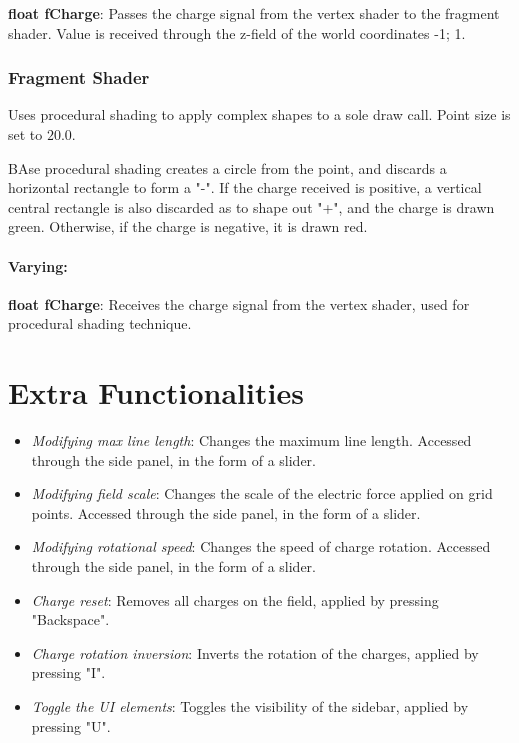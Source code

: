 \documentclass[10pt]{report}
\begin{document}
\textbf{float fCharge}: Passes the charge signal from the vertex shader to the fragment shader. Value is received through the z-field of the world coordinates {-1; 1}.

\subsection{Fragment Shader}

Uses procedural shading to apply complex shapes to a sole draw call. Point size is set to $20.0$.

BAse procedural shading creates a circle from the point, and discards a horizontal rectangle to form a "-".
If the charge received is positive, a vertical central rectangle is also discarded as to shape out "+", and the charge is drawn green.
Otherwise, if the charge is negative, it is drawn red.

\subsubsection{Varying:}

\textbf{float fCharge}: Receives the charge signal from the vertex shader, used for procedural shading technique.

\chapter{Extra Functionalities}

\begin{itemize}
    \item \emph{Modifying max line length}: Changes the maximum line length. Accessed through the side panel, in the form of a slider.
    \item \emph{Modifying field scale}: Changes the scale of the electric force applied on grid points. Accessed through the side panel, in the form of a slider.
    \item \emph{Modifying rotational speed}: Changes the speed of charge rotation. Accessed through the side panel, in the form of a slider.
    \item \emph{Charge reset}: Removes all charges on the field, applied by pressing "Backspace".
    \item \emph{Charge rotation inversion}: Inverts the rotation of the charges, applied by pressing "I".
    \item \emph{Toggle the UI elements}: Toggles the visibility of the sidebar, applied by pressing "U".
\end{itemize}
\end{document}
